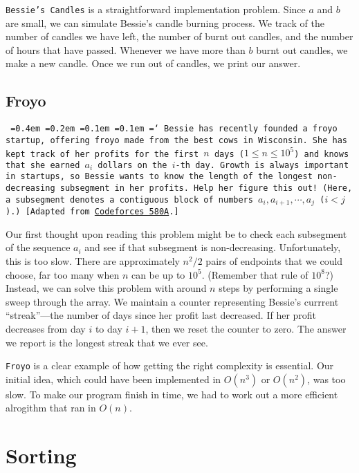 \texttt{Bessie's Candles} is a straightforward implementation problem. Since $a$ and $b$ are small, we can simulate Bessie's candle burning process. We track of the number of candles we have left, the number of burnt out candles, and the number of hours that have passed. Whenever we have more than $b$ burnt out candles, we make a new candle. Once we run out of candles, we print our answer.

\subsection{Froyo}

\texttt{
  \font=0.4em%
  \font=0.2em%
  \font=0.1em%
  \font=0.1em%
  \hyphenchar\font=`\-%
  Bessie has recently founded a froyo startup, offering froyo made from the best cows in Wisconsin. She has kept track of her profits for the first $n$ days ($1 \le n \le 10^5$) and knows that she earned $a_i$ dollars on the $i$-th day. Growth is always important in startups, so Bessie wants to know the length of the longest non-decreasing subsegment in her profits. Help her figure this out! (Here, a subsegment denotes a contiguous block of numbers $a_i, a_{i+1}, \cdots, a_j$ ($i < j$).) [Adapted from \href{http://codeforces.com/problemset/problem/580/A}{Codeforces 580A}.]
}

Our first thought upon reading this problem might be to check each subsegment of the sequence $a_i$ and see if that subsegment is non-decreasing. Unfortunately, this is too slow. There are approximately $n^2/2$ pairs of endpoints that we could choose, far too many when $n$ can be up to $10^5$. (Remember that rule of $10^8$?) Instead, we can solve this problem with around $n$ steps by performing a single sweep through the array. We maintain a counter representing Bessie's currrent ``streak''---the number of days since her profit last decreased. If her profit decreases from day $i$ to day $i+1$, then we reset the counter to zero. The answer we report is the longest streak that we ever see.

\texttt{Froyo} is a clear example of how getting the right complexity is essential. Our initial idea, which could have been implemented in $O(n^3)$ or $O(n^2)$, was too slow. To make our program finish in time, we had to work out a more efficient alrogithm that ran in $O(n)$.

\section{Sorting}

